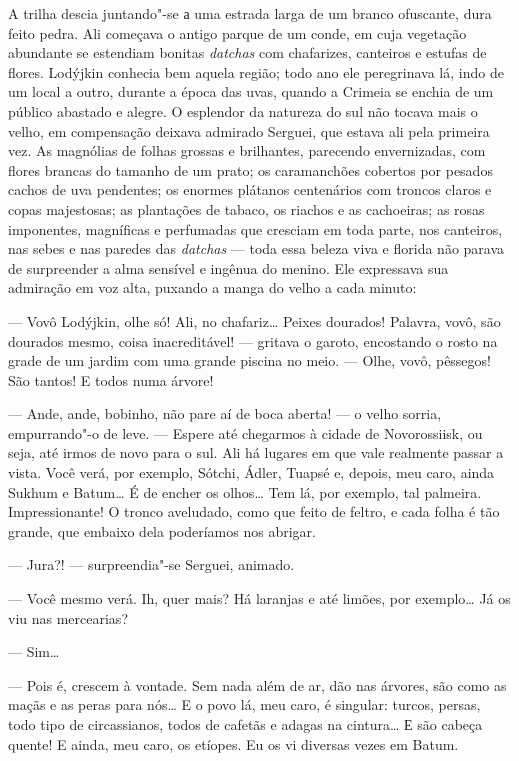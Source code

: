 A trilha descia juntando"-se а uma estrada larga de um branco ofuscante,
dura feito pedra. Ali começava o antigo parque de um conde, em cuja
vegetação abundante se estendiam bonitas \emph{datchas} com chafarizes,
canteiros e estufas de flores. Lodýjkin conhecia bem aquela região; todo
ano ele peregrinava lá, indo de um local a outro, durante a época das
uvas, quando a Crimeia se enchia de um público abastado e alegre. O
esplendor da natureza do sul não tocava mais o velho, em compensação
deixava admirado Serguei, que estava ali pela primeira vez. As magnólias
de folhas grossas e brilhantes, parecendo envernizadas, com flores
brancas do tamanho de um prato; os caramanchões cobertos por pesados
cachos de uva pendentes; os enormes plátanos centenários com troncos
claros e copas majestosas; as plantações de tabaco, os riachos e as
cachoeiras; as rosas imponentes, magníficas e perfumadas que cresciam em
toda parte, nos canteiros, nas sebes e nas paredes das \emph{datchas}
--- toda essa beleza viva e florida não parava de surpreender a alma
sensível e ingênua do menino. Ele expressava sua admiração em voz alta,
puxando a manga do velho a cada minuto:

--- Vovô Lodýjkin, olhe só! Ali, no chafariz\ldots{} Peixes dourados!
Palavra, vovô, são dourados mesmo, coisa inacreditável! --- gritava o
garoto, encostando o rosto na grade de um jardim com uma grande piscina
no meio. --- Olhe, vovô, pêssegos! São tantos! E todos numa árvore!

--- Ande, ande, bobinho, não pare aí de boca aberta! --- o velho sorria,
empurrando"-o de leve. --- Espere até chegarmos à cidade de Novorossiisk,
ou seja, até irmos de novo para o sul. Ali há lugares em que vale
realmente passar a vista. Você verá, por exemplo, Sótchi, Ádler, Tuapsé
e, depois, meu caro, ainda Sukhum e Batum\ldots{} É de encher os olhos\ldots{} Tem
lá, por exemplo, tal palmeira. Impressionante! O tronco aveludado, como
que feito de feltro, e cada folha é tão grande, que embaixo dela
poderíamos nos abrigar.

--- Jura?! --- surpreendia"-se Serguei, animado.

--- Você mesmo verá. Ih, quer mais? Há laranjas e até limões, por
exemplo\ldots{} Já os viu nas mercearias?

--- Sim\ldots{}

--- Pois é, crescem à vontade. Sem nada além de ar, dão nas árvores, são
como as maçãs e as peras para nós\ldots{} E o povo lá, meu caro, é singular:
turcos, persas, todo tipo de circassianos, todos de cafetãs e adagas na
cintura\ldots{} Е são cabeça quente! E ainda, meu caro, os etíopes. Eu os vi
diversas vezes em Batum.

